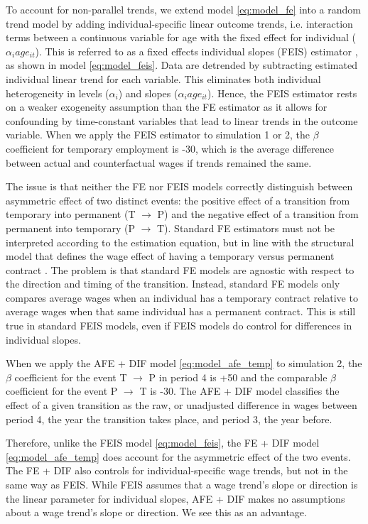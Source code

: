 To account for non-parallel trends, we extend model \ref{eq:model_fe} into a random trend model by adding individual-specific linear outcome trends, i.e. interaction terms between a continuous variable for age with the fixed effect for individual ($\alpha_i age_{it}$).  This is referred to as a fixed effects individual slopes (FEIS) estimator  \citep{ludwig_is_2018}, as shown in model \ref{eq:model_feis}.  Data are detrended by subtracting estimated individual linear trend for each variable. This eliminates both individual heterogeneity in levels ($\alpha_i$) and slopes ($\alpha_i age_{it}$). Hence, the FEIS estimator rests on a weaker exogeneity assumption than the FE estimator as it allows for confounding by time-constant variables that lead to linear trends in the outcome variable. When we apply the FEIS estimator to simulation 1 or 2, the $\beta$ coefficient for temporary employment is -30, which is the average difference between actual and counterfactual wages if trends remained the same. 

The issue is that neither the FE nor FEIS models correctly distinguish between asymmetric effect of two distinct events: the positive effect of a transition from temporary into permanent (T $\rightarrow$ P) and the negative effect of a transition from permanent into temporary (P $\rightarrow$ T).  Standard FE estimators must not be interpreted according to the estimation equation, but in line with the structural model that defines the wage effect of having a temporary versus permanent contract \citep{an_causal_2017,wooldridge_econometric_2010}.   The problem is that standard FE models are agnostic with respect to the direction and timing of the transition. Instead, standard FE models only compares average wages when an individual has a temporary contract relative to average wages when that same individual has a permanent contract.  This is still true in standard FEIS models, even if FEIS models do control for differences in individual slopes. 

When we apply the AFE + DIF model \ref{eq:model_afe_temp} to simulation 2, the $\beta$ coefficient for the event T $\rightarrow$ P in period 4 is +50 and the comparable $\beta$ coefficient for the event P $\rightarrow$ T is -30.  The AFE + DIF model classifies the effect of a given transition as the raw, or unadjusted difference in wages between period 4, the year the transition takes place, and period 3, the year before.   

Therefore, unlike the FEIS model \ref{eq:model_feis}, the FE + DIF model  \ref{eq:model_afe_temp} does account for the asymmetric effect of the two events.  The FE + DIF also controls for individual-specific wage trends, but not in the same way as FEIS.  While FEIS assumes that a wage trend's slope or direction is the linear parameter for individual slopes, AFE + DIF makes no assumptions about a wage trend's slope or direction.  We see this as an advantage.  

